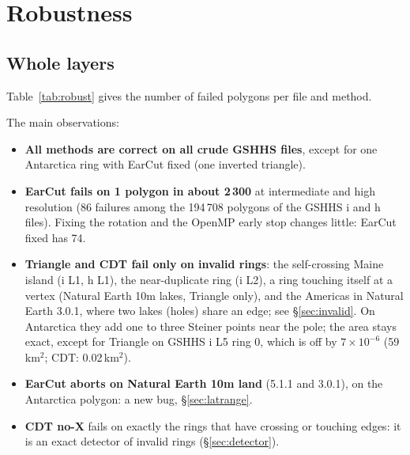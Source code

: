\documentclass[11pt,a4paper]{article}
\begin{document}
\section{Robustness}

\subsection{Whole layers}

Table~\ref{tab:robust} gives the number of failed polygons per file and method.

\begin{table}[!htb]
\centering\small
\resizebox{\textwidth}{!}{}
\caption{Failed polygons (bold) per file. ``(+$k$)'': $k$ more polygons correct but with Steiner
points. ``degen.'': zero-area rings, not counted. ``crash'': the method aborted.}
\label{tab:robust}
\end{table}

\noindent The main observations:

\begin{itemize}
\item \textbf{All methods are correct on all crude GSHHS files}, except for one Antarctica ring
  with EarCut fixed (one inverted triangle).
\item \textbf{EarCut fails on 1 polygon in about 2\,300} at intermediate and high resolution
  (86 failures among the 194\,708 polygons of the GSHHS i and h files). Fixing the rotation and the
  OpenMP early stop changes little: EarCut fixed has 74.
\item \textbf{Triangle and CDT fail only on invalid rings}: the self-crossing Maine island
  (i L1, h L1), the near-duplicate ring (i L2), a ring touching itself at a vertex (Natural
  Earth 10m lakes, Triangle only), and the Americas in Natural Earth 3.0.1, where two lakes
  (holes) share an edge; see \S\ref{sec:invalid}. On Antarctica they add one to three Steiner
  points near the pole; the area stays exact, except for Triangle on GSHHS i L5 ring 0, which is
  off by $7\times10^{-6}$ (59\,km$^2$; CDT: 0.02\,km$^2$).
\item \textbf{EarCut aborts on Natural Earth 10m land} (5.1.1 and 3.0.1), on the Antarctica
  polygon: a new bug, \S\ref{sec:latrange}.
\item \textbf{CDT no-X} fails on exactly the rings that have crossing or touching edges: it is an
  exact detector of invalid rings (\S\ref{sec:detector}).
\end{itemize}
\end{document}
